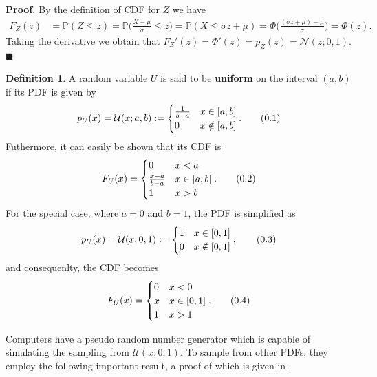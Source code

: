 \documentclass[10pt]{article}
\theoremstyle{definition}
\newtheorem{defn}{Definition}[section]
\newenvironment{prf}{\noindent\textbf{Proof.}}{\hfill$\blacksquare$}
\newcommand\eqnum{\addtocounter{equation}{1}\tag{\arabic{section}.\arabic{equation}}}
\begin{document}
\begin{prf}
By the definition of CDF for $Z$ we have
\begin{align*}
F_Z(z) &= \mathbb{P}(Z \leq z) = \mathbb{P}\Big(\frac{X-\mu}{\sigma} \leq z\Big) 
= \mathbb{P}(X \leq \sigma z + \mu) = \Phi\Big(\frac{(\sigma z + \mu)-\mu}{\sigma}\Big) = \Phi(z) .
\end{align*}
Taking the derivative we obtain that $F_Z'(z) = \Phi'(z) = p_Z(z) = \mathcal{N}(z; 0, 1)$.
\end{prf}
\begin{defn}
A random variable $U$ is said to be \textbf{uniform} on the interval $(a, b)$ if its PDF is given by
\begin{equation*}
p_U(x) = \mathcal{U}(x; a, b) :=
\begin{cases} 
\frac{1}{b-a} & x \in [a, b] \\
0 & x \notin [a, b]
\end{cases}.
\eqnum
\end{equation*}
Futhermore, it can easily be shown that its CDF is
\begin{equation*}
F_U(x) = 
\begin{cases} 
0 & x < a \\
\frac{x-a}{b-a} & x \in [a, b] \\
1 & x>b
\end{cases}.
\eqnum
\end{equation*}
For the special case, where $a=0$ and $b=1$, the PDF is simplified as
\begin{equation*}
p_U(x) = \mathcal{U}(x; 0, 1) :=
\begin{cases} 
1 & x \in [0, 1] \\
0 & x \notin [0, 1]
\end{cases},
\eqnum
\end{equation*}
and consequenlty, the CDF becomes
\begin{equation*}
F_U(x) = 
\begin{cases} 
0 & x < 0 \\
x & x \in [0, 1] \\
1 & x>1
\end{cases}.
\eqnum
\end{equation*}
\end{defn}
 Computers have a pseudo random number generator which is capable of simulating the sampling from $\mathcal{U}(x; 0, 1)$. To sample from other PDFs, they employ the following important result, a proof of which is given in \cite{Gharamani2019}.
\end{document}
